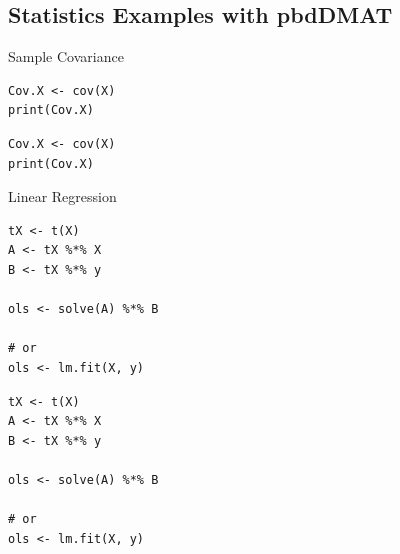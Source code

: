 \subsection{Statistics Examples with pbdDMAT}

\begin{frame}[fragile]
  \begin{exampleblock}{Sample Covariance}\pause
\begin{lstlisting}[title=Serial Code]
Cov.X <- cov(X)
print(Cov.X)
\end{lstlisting}

\begin{lstlisting}[title=Parallel Code]
Cov.X <- cov(X)
print(Cov.X)
\end{lstlisting}
  \end{exampleblock}
\end{frame}

\begin{frame}
  \begin{exampleblock}{Linear Regression}\pause
\begin{lstlisting}[title=Serial Code]
tX <- t(X)
A <- tX %*% X
B <- tX %*% y

ols <- solve(A) %*% B

# or
ols <- lm.fit(X, y)
\end{lstlisting}
  
\begin{lstlisting}[title=Parallel Code]
tX <- t(X)
A <- tX %*% X
B <- tX %*% y

ols <- solve(A) %*% B

# or
ols <- lm.fit(X, y)
\end{lstlisting}
  \end{exampleblock}
\end{frame}



